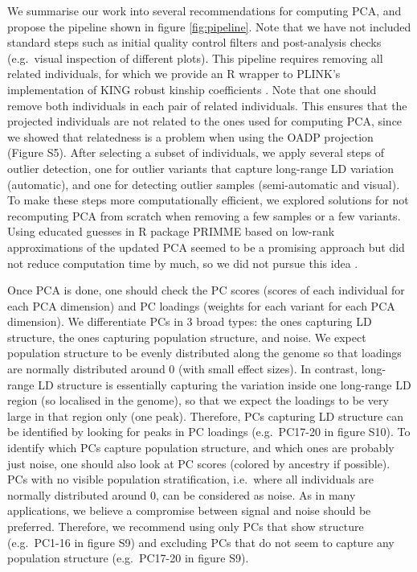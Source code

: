 \documentclass{bioinfo}
\begin{document}
We summarise our work into several recommendations for computing PCA, and propose the pipeline shown in figure \ref{fig:pipeline}. Note that we have not included standard steps such as initial quality control filters and post-analysis checks (e.g.\ visual inspection of different plots).
This pipeline requires removing all related individuals, for which we provide an R wrapper to PLINK's implementation of KING robust kinship coefficients \cite[]{manichaikul2010robust,chang2015second}. 
Note that one should remove both individuals in each pair of related individuals. This ensures that the projected individuals are not related to the ones used for computing PCA, since we showed that relatedness is a problem when using the OADP projection (Figure S5).
After selecting a subset of individuals, we apply several steps of outlier detection, one for outlier variants that capture long-range LD variation (automatic), and one for detecting outlier samples (semi-automatic and visual).
To make these steps more computationally efficient, we explored solutions for not recomputing PCA from scratch when removing a few samples or a few variants. Using educated guesses in R package PRIMME based on low-rank approximations of the updated PCA seemed to be a promising approach but did not reduce computation time by much, so we did not pursue this idea \cite[]{brand2003fast,wu2017primme}. 

Once PCA is done, one should check the PC scores (scores of each individual for each PCA dimension) and PC loadings (weights for each variant for each PCA dimension). 
We differentiate PCs in 3 broad types: the ones capturing LD structure, the ones capturing population structure, and noise.
We expect population structure to be evenly distributed along the genome so that loadings are normally distributed around 0 (with small effect sizes).
In contrast, long-range LD structure is essentially capturing the variation inside one long-range LD region (so localised in the genome), so that we expect the loadings to be very large in that region only (one peak).
Therefore, PCs capturing LD structure can be identified by looking for peaks in PC loadings (e.g.\ PC17-20 in figure S10). 
To identify which PCs capture population structure, and which ones are probably just noise, one should also look at PC scores (colored by ancestry if possible).
PCs with no visible population stratification, i.e.\ where all individuals are normally distributed around 0, can be considered as noise.   
As in many applications, we believe a compromise between signal and noise should be preferred. Therefore, we recommend using only PCs that show structure (e.g.\ PC1-16 in figure S9) and excluding PCs that do not seem to capture any population structure (e.g.\ PC17-20 in figure S9).
\end{document}
